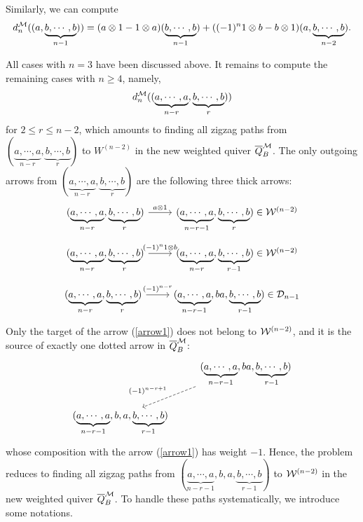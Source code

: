\documentclass[10pt, reqno]{amsart}
\theoremstyle{definition}
\theoremstyle{remark}
\numberwithin{equation}{section}
\begin{document}
Similarly, we can compute
\[d_n^{\mathcal{M}}((a,\underbrace{b, \cdots,b}_{n-1}))=(a\otimes 1-1\otimes a)(\underbrace{b, \cdots,b}_{n-1})+((-1)^n 1\otimes b-b\otimes1)(a, \underbrace{b, \cdots,b}_{n-2}).\]

All cases with \(n=3\) have been discussed above. It remains to compute the remaining cases with \(n\ge 4\), namely, 
$$d_n^{\mathcal{M}}((\underbrace{a, \cdots,a}_{n-r},\underbrace{b, \cdots,b}_r))$$
for \(2 \le r \le n-2\), which amounts to finding all zigzag paths from $(\underbrace{a, \cdots,a}_{n-r},\underbrace{b, \cdots,b}_{r})$ to $W^{(n-2)}$ in the new weighted quiver $\overline{Q}_B^{\mathcal{M}}$.
 The only outgoing arrows from \((\underbrace{a, \cdots,a}_{n-r},\underbrace{b, \cdots,b}_{r})\) are the following three thick arrows: 
\[   \begin{tikzcd}
 (\underbrace{a, \cdots,a}_{n-r},\underbrace{b, \cdots,b}_{r}) \arrow[r,"a \otimes 1"]  & (\underbrace{a, \cdots,a}_{n-r-1}, \underbrace{b, \cdots,b}_{r}) \in \calW^{(n-2)}
    \end{tikzcd}\]
\[\begin{tikzcd}
 (\underbrace{a, \cdots,a}_{n-r},\underbrace{b, \cdots,b}_{r}) \arrow[r,"(-1)^n 1 \otimes b"]  & (\underbrace{a, \cdots,a}_{n-r}, \underbrace{b, \cdots,b}_{r-1}) \in \calW^{(n-2)} 
    \end{tikzcd}\]
\begin{equation}\label{arrow1}
    \begin{tikzcd}
 (\underbrace{a, \cdots,a}_{n-r},\underbrace{b, \cdots,b}_{r}) \arrow[r,"(-1)^{n-r}"]  & (\underbrace{a, \cdots,a}_{n-r-1}, ba, \underbrace{b, \cdots,b}_{r-1}) \in \calD_{n-1}
    \end{tikzcd}
\end{equation}
Only the target of the arrow (\ref{arrow1}) does not belong to \(\mathcal{W}^{(n-2)}\), and it is the source of exactly one dotted arrow in \(\overline{Q}_B^{\mathcal{M}}\):
\[\begin{tikzcd}
 & (\underbrace{a, \cdots,a}_{n-r-1}, ba, \underbrace{b, \cdots,b}_{r-1}) \arrow[ld,dashed,"(-1)^{n-r+1}",swap] \\
 (\underbrace{a, \cdots,a}_{n-r-1}, b, a, \underbrace{b, \cdots,b}_{r-1})  
    \end{tikzcd}\] 
whose composition with the arrow (\ref{arrow1}) has weight $-1$. Hence, the problem reduces to finding all zigzag paths from \((\underbrace{a, \cdots,a}_{n-r-1}, b, a, \underbrace{b, \cdots,b}_{r-1})\) to $\mathcal{W}^{(n-2)}$ in the new weighted quiver $\overline{Q}_B^{\mathcal{M}}$. 
To handle these paths systematically, we introduce some notations.

\end{document}
